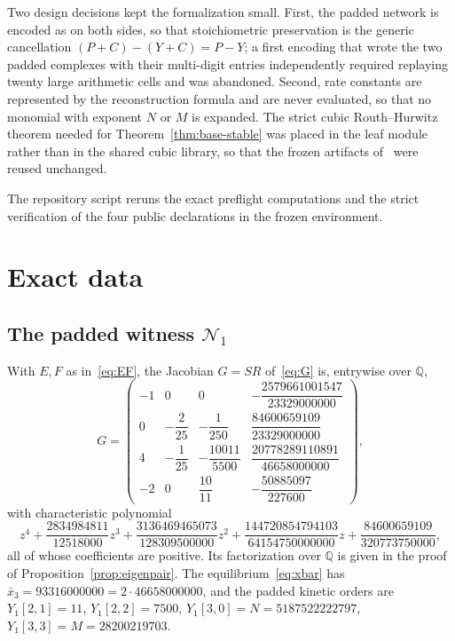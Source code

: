 \documentclass[11pt,a4paper]{article}
\theoremstyle{plain}
\theoremstyle{definition}
\theoremstyle{remark}
\newcommand{\Q}{\mathbb{Q}}
\newcommand{\xbar}{\bar{x}}
\newcommand{\Nbig}{5187522222797}
\newcommand{\Mbig}{28200219703}
\newcommand{\Dbig}{46658000000}
\begin{document}
Two design decisions kept the formalization small. First, the padded network is encoded as  on both sides, so that stoichiometric preservation is the generic cancellation $(P+C)-(Y+C)=P-Y$; a first encoding that wrote the two padded complexes with their multi-digit entries independently required replaying twenty large arithmetic cells and was abandoned. Second, rate constants are represented by the reconstruction formula and are never evaluated, so that no monomial with exponent $N$ or $M$ is expanded. The strict cubic Routh--Hurwitz theorem needed for Theorem~\ref{thm:base-stable} was placed in the leaf module rather than in the shared cubic library, so that the frozen artifacts of~\cite{Companion2026} were reused unchanged.

The repository script  reruns the exact preflight computations and the strict verification of the four public declarations in the frozen environment.

\appendix

\section{Exact data}\label{app:data}

\subsection*{The padded witness $\mathcal N_1$}
With $E,F$ as in~\eqref{eq:EF}, the Jacobian $G=SR$ of~\eqref{eq:G} is, entrywise over $\Q$,
\[
G=\begin{pmatrix}
-1&0&0&-\dfrac{2579661001547}{23329000000}\\[8pt]
0&-\dfrac{2}{25}&-\dfrac{1}{250}&\dfrac{84600659109}{23329000000}\\[8pt]
4&-\dfrac{1}{25}&-\dfrac{10011}{5500}&\dfrac{20778289110891}{46658000000}\\[8pt]
-2&0&\dfrac{10}{11}&-\dfrac{50885097}{227600}
\end{pmatrix},
\]
with characteristic polynomial
\[
  z^4+\frac{2834984811}{12518000}z^3+\frac{3136469465073}{128309500000}z^2+\frac{144720854794103}{64154750000000}z+\frac{84600659109}{320773750000},
\]
all of whose coefficients are positive. Its factorization over $\Q$ is given in the proof of Proposition~\ref{prop:eigenpair}. The equilibrium~\eqref{eq:xbar} has $\xbar_3=93316000000=2\cdot\Dbig$, and the padded kinetic orders are $Y_1[2,1]=11$, $Y_1[2,2]=7500$, $Y_1[3,0]=N=\Nbig$, $Y_1[3,3]=M=\Mbig$.
\end{document}
